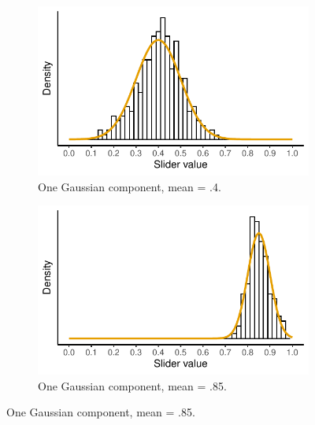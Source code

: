 \documentclass{language}
\newcommand{\6}{\mbox{$[\hspace*{-.6mm}[$}}
\newcommand{\9}{\mbox{$]\hspace*{-.6mm}]$}}
\begin{document}
\begin{figure}[h!]
\centering

\begin{subfigure}{.4\textwidth}
\includegraphics[width=\textwidth]{Language-figures/color/Figure18a}
\caption{One Gaussian component, mean = .4.}
\label{fig:1comp}
\end{subfigure}
\begin{subfigure}{.4\textwidth}
\includegraphics[width=\textwidth]{Language-figures/color/Figure18b}
\caption{One Gaussian component, mean = .85.}
\label{fig:1comp}
\end{subfigure}



\end{figure}
\end{document}
